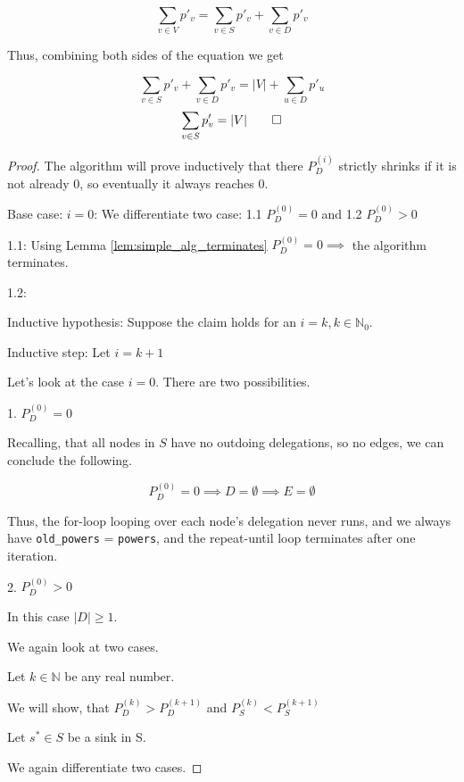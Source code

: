 \[
\sum_{v \in V} p'_v = \sum_{v \in S} p'_v  + \sum_{v \in D} p'_v 
\]

Thus, combining both sides of the equation we get

\[
\sum_{v \in S} p'_v  + \sum_{v \in D} p'_v  = |V| + \sum_{u \in D} p'_u
\]
\[
\sum_{v \in S} p'_v   = |V| \qed
\]







\begin{proof}The algorithm will prove inductively that there $P_D^{(i)}$ strictly shrinks if it is not already 0, so eventually it always reaches 0.

Base case: $i = 0$: We differentiate two case: 	1.1 $P_D^{(0)} = 0$ and 1.2 $P_D^{(0)} > 0$

1.1: Using Lemma \ref{lem:simple_alg_terminates} $P_D^{(0)} = 0 \implies $ the algorithm terminates.

1.2: %

Inductive hypothesis: Suppose the claim holds for an $i = k, k \in \mathbb{N}_0$.

Inductive step: Let $i = k + 1$



Let's look at the case $i = 0$. There are two possibilities. 

1. $P_D^{(0)} = 0$

Recalling, that all nodes in $S$ have no outdoing delegations, so no edges, we can conclude the following.

\[
P_D^{(0)} = 0 \implies D = \emptyset \implies E = \emptyset
\]

Thus, the for-loop looping over each node's delegation never runs, and we always have \texttt{old\_powers} = \texttt{powers}, and the repeat-until loop terminates after one iteration.

2. $P_D^{(0)} > 0$

In this case $|D| \ge 1$.

We again look at two cases.

Let $k \in \mathbb{N}$ be any real number.

We will show, that $P_D^{(k)} > P_D^{(k + 1)}$ and $P_S^{(k)} < P_S^{(k + 1)}$

Let $s^* \in S$ be a sink in S.

We again differentiate two cases.


\end{proof}
